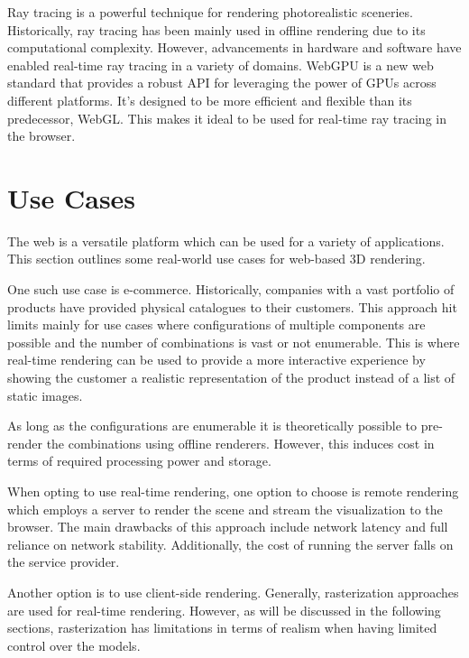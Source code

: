 
Ray tracing is a powerful technique for rendering photorealistic sceneries. Historically, ray tracing has been mainly used in offline rendering due to its computational complexity. However, advancements in hardware and software have enabled real-time ray tracing in a variety of domains.
WebGPU is a new web standard that provides a robust API for leveraging the power of GPUs across different platforms. It's designed to be more efficient and flexible than its predecessor, WebGL. This makes it ideal to be used for real-time ray tracing in the browser.

\section{Use Cases}

The web is a versatile platform which can be used for a variety of applications. This section outlines some real-world use cases for web-based 3D rendering.

One such use case is e-commerce. Historically, companies with a vast portfolio of products have provided physical catalogues to their customers. This approach hit limits mainly for use cases where configurations of multiple components are possible and the number of combinations is vast or not enumerable. This is where real-time rendering can be used to provide a more interactive experience by showing the customer a realistic representation of the product instead of a list of static images.

As long as the configurations are enumerable it is theoretically possible to pre-render the combinations using offline renderers. However, this induces cost in terms of required processing power and storage.

When opting to use real-time rendering, one option to choose is remote rendering which employs a server to render the scene and stream the visualization to the browser. The main drawbacks of this approach include network latency and full reliance on network stability. Additionally, the cost of running the server falls on the service provider.

Another option is to use client-side rendering. Generally, rasterization approaches are used for real-time rendering. However, as will be discussed in the following sections, rasterization has limitations in terms of realism when having limited control over the models.

